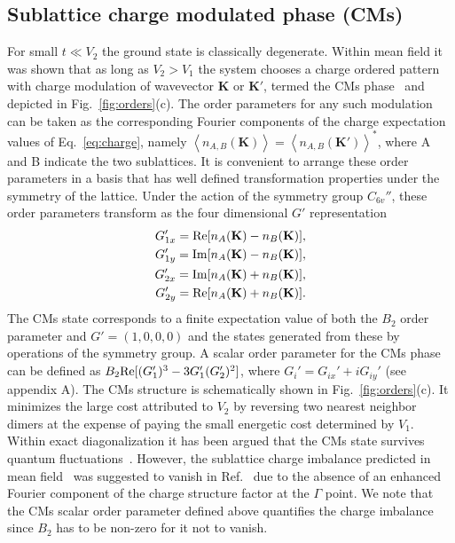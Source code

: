 \documentclass[aps,prx,10pt,twocolumn,floatfix,superscriptaddress,showpacs,numerical,footinbib]{revtex4-1}
\begin{document}
\subsection{Sublattice charge modulated phase (CMs)}
%
For small $t \ll V_{2}$ the ground state is classically degenerate. 
%
Within mean field it was shown that as long as $V_{2}>V_{1}$ the system chooses a charge ordered pattern with charge modulation 
of wavevector $\mathbf{K}$ or $\mathbf{K}'$, termed the CMs phase~\cite{GCC13} and depicted in Fig.~\ref{fig:orders}(c). 
%
The order parameters for any such modulation can be taken as the corresponding Fourier components of the charge expectation values of Eq.~\eqref{eq:charge},
namely $\left\langle n_{A,B}(\mathbf{K}) \right\rangle = \left\langle n_{A,B}(\mathbf{K}') \right\rangle^*$, where A and B indicate the two sublattices.
%
It is convenient to arrange these order parameters in a basis that has well defined transformation properties under the symmetry of the lattice.
%
Under the action of the symmetry group $C_{6v}''$, these order parameters transform as the four dimensional $G'$ representation \cite{Basko08,deJuan13}
%
\begin{align}
G_{1x}' = {\rm Re}[n_{A}(\mathbf{K}) -n_{B}(\mathbf{K})], \\
G_{1y}' =  {\rm Im}[n_{A}(\mathbf{K}) -n_{B}(\mathbf{K})], \\
G_{2x}' =  {\rm Im}[n_{A}(\mathbf{K}) +n_{B}(\mathbf{K})], \\
G_{2y}' =  {\rm Re}[n_{A}(\mathbf{K}) +n_{B}(\mathbf{K})].
\end{align}
%
The CMs state corresponds to a finite expectation value of both the $B_2$ order parameter and $G' = (1,0,0,0)$ and the states generated from these by operations of the symmetry group. 
%
A scalar order parameter for the CMs phase can be defined as $B_2 {\rm Re}[(G_1')^3-3G_1'(G_2')^2]$, where $G_i' = G_{ix}'+iG_{iy}'$ (see appendix A).
%
The CMs structure is schematically shown in Fig.~\ref{fig:orders}(c). 
%
It minimizes the large cost attributed to $V_{2}$ by reversing two nearest neighbor dimers at the expense of paying the small energetic cost determined by $V_{1}$.
%
Within exact diagonalization it has been argued that the CMs state survives quantum fluctuations~\cite{GGNVC13,DH14,DCH14}.
% 
However, the sublattice charge imbalance predicted in mean field~\cite{GCC13} was suggested to vanish in Ref.~ 
due to the absence of an enhanced Fourier component of the charge structure factor at the $\Gamma$ point.
%
We note that the CMs scalar order parameter defined above quantifies the charge imbalance since $B_{2}$ has to be non-zero for it not to vanish.\\
\end{document}
